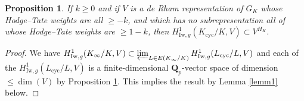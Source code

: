\documentclass[10pt,a4paper]{amsart}
\newtheorem{prop}{Proposition}
\newcommand{\Iw}{\mathrm{Iw}}
\newcommand{\Qp}{\mathbf{Q}_p}
\newcommand{\cyc}{\mathrm{cyc}}
\renewcommand{\projlim}{\varprojlim}
\begin{document}
\begin{prop}
\label{prop1}
If $k \geq 0$ and if $V$ is a de Rham representation of $G_K$ whose Hodge--Tate weights are all $\geq -k$, and which has no subrepresentation all of whose Hodge--Tate weights are $\geq 1-k$, then $H^1_{\Iw,g}(K_{\cyc}/K,V) \subset V^{H_K}$.
\end{prop}

\begin{proof}
We have $H^1_{\Iw,g}(K_\infty/K,V) \subset \projlim_{L \in E(K_\infty/K)} H^1_{\Iw,g}(L_{\cyc}/L,V)$ and each of the $H^1_{\Iw,g}(L_{\cyc}/L,V)$ is a finite-dimensional $\Qp$-vector space of dimension $\leq \dim(V)$ by Proposition \ref{prop1}. 
This implies the result by Lemma \ref{lemm1} below.
\end{proof}
\end{document}
